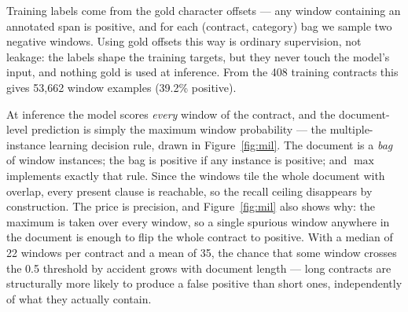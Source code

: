 Training labels come from the gold character offsets --- any window containing an annotated span is positive, and for each (contract, category) bag we sample two negative windows. Using gold offsets this way is ordinary supervision, not leakage: the labels shape the training targets, but they never touch the model's input, and nothing gold is used at inference. From the 408 training contracts this gives 53{,}662 window examples (39.2\% positive).

At inference the model scores \emph{every} window of the contract, and the document-level prediction is simply the maximum window probability --- the multiple-instance learning decision rule, drawn in Figure~\ref{fig:mil}. The document is a \emph{bag} of window instances; the bag is positive if any instance is positive; and $\max$ implements exactly that rule. Since the windows tile the whole document with overlap, every present clause is reachable, so the recall ceiling disappears by construction. The price is precision, and Figure~\ref{fig:mil} also shows why: the maximum is taken over every window, so a single spurious window anywhere in the document is enough to flip the whole contract to positive. With a median of 22 windows per contract and a mean of 35, the chance that some window crosses the 0.5 threshold by accident grows with document length --- long contracts are structurally more likely to produce a false positive than short ones, independently of what they actually contain.

